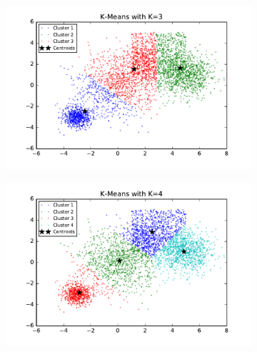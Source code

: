 \begin{description}
\begin{description}
\begin{figure}[!h]
        \centering
        \begin{subfigure}[b]{0.475\textwidth}
            \centering
            \includegraphics[width=\textwidth]{./figures/bigClustering_kMeans_3.pdf}
        \end{subfigure}
        \hfill
        \begin{subfigure}[b]{0.475\textwidth}  
            \centering 
            \includegraphics[width=\textwidth]{./figures/bigClustering_kMeans_4.pdf}
        \end{subfigure}
        \begin{subfigure}[b]{0.475\textwidth}  
            \centering 

\end{subfigure}
\end{figure}
\end{description}
\end{description}
